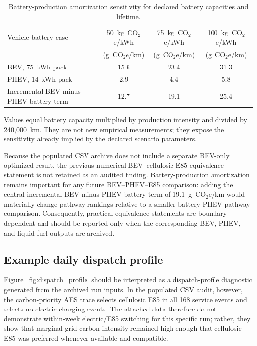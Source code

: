 \documentclass[cleantechnol,article,submit,pdftex,moreauthors]{Definitions/mdpi}
\newcommand{\gcoeqkm}{g~CO$_2$e/km}
\begin{document}
\begin{table}[htbp]
\centering
\begin{threeparttable}
\caption{Battery-production amortization sensitivity for declared battery capacities and lifetime.}
\label{tab:battery_sensitivity}
\scriptsize
\begin{tabular}{lccc}
\toprule
Vehicle battery case & 50~kg~CO$_2$e/kWh & 75~kg~CO$_2$e/kWh & 100~kg~CO$_2$e/kWh \\
& (\gcoeqkm{}) & (\gcoeqkm{}) & (\gcoeqkm{}) \\
\midrule
BEV, 75~kWh pack & 15.6 & 23.4 & 31.3 \\
PHEV, 14~kWh pack & 2.9 & 4.4 & 5.8 \\
Incremental BEV minus PHEV battery term & 12.7 & 19.1 & 25.4 \\
\bottomrule
\end{tabular}
\begin{tablenotes}
\footnotesize
\item Values equal battery capacity multiplied by production intensity and divided by 240,000~km. They are not new empirical measurements; they expose the sensitivity already implied by the declared scenario parameters.
\end{tablenotes}
\end{threeparttable}
\end{table}

Because the populated CSV archive does not include a separate BEV-only optimized result, the previous numerical BEV--cellulosic E85 equivalence statement is not retained as an audited finding. Battery-production amortization remains important for any future BEV--PHEV--E85 comparison: adding the central incremental BEV-minus-PHEV battery term of 19.1~\gcoeqkm{} would materially change pathway rankings relative to a smaller-battery PHEV pathway comparison. Consequently, practical-equivalence statements are boundary-dependent and should be reported only when the corresponding BEV, PHEV, and liquid-fuel outputs are archived.

\subsection{Example daily dispatch profile}
\label{subsec:dispatch_profile}

Figure~\ref{fig:dispatch_profile} should be interpreted as a dispatch-profile diagnostic generated from the archived run inputs. In the populated CSV audit, however, the carbon-priority AES trace selects cellulosic E85 in all 168 service events and selects no electric charging events. The attached data therefore do not demonstrate within-week electric/E85 switching for this specific run; rather, they show that marginal grid carbon intensity remained high enough that cellulosic E85 was preferred whenever available and compatible.
\end{document}
